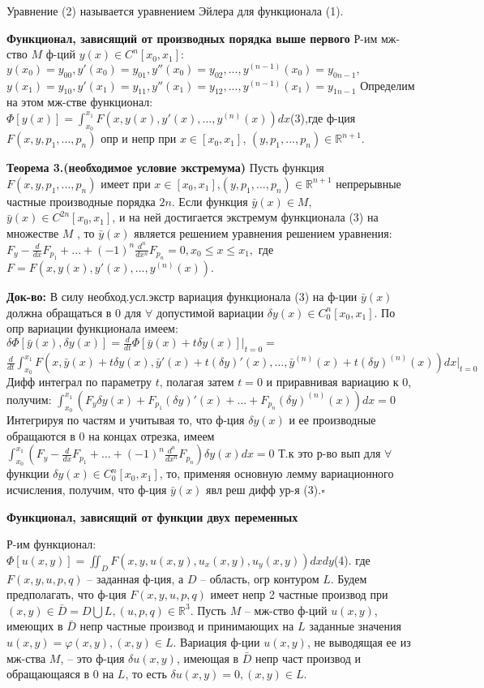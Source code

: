 Уравнение (2) называется уравнением Эйлера для функционала (1).

\textbf{Функционал, зависящий от производных порядка выше
первого}
Р-им мж-ство $M$ ф-ций $y(x) \in C^n[x_0, x_1]:$
$y(x_0) = y_{00} , y'(x_0) = y_{01}, y''(x_0) = y_{02},..., y^{(n-1)}(x_0) = y_{0n-1},$
$y(x_1) = y_{10} , y'(x_1) = y_{11}, y''(x_1) = y_{12},..., y^{(n-1)}(x_1) = y_{1n-1}$
Определим на этом мж-стве функционал:$\Phi[y(x)]=\int_{x_0}^{x_1}F(x,y(x),y'(x),...,y^{(n)}(x))dx$(3),где ф-ция $F(x,y,p_1,...,p_n)$ опр и непр при $x \in [x_0, x_1]$,
$(y,p_1,..., p_n) \in \mathbb{R}^{n+1}$.

\textbf{Теорема 3.(необходимое условие экстремума)}
    Пусть функция $F(x,y,p_1,...,p_n)$ имеет при $x\in[x_0, x_1]$,$(y,p_1,..., p_n) \in \mathbb{R}^{n+1}$ непрерывные частные производные порядка $2n$. Если функция $\bar y(x) \in M$, $\bar y(x) \in C^{2n}[x_0, x_1]$, и на ней достигается экстремум функционала (3) на множестве $M$ , то $\bar y(x)$ является решением уравнения
    решением уравнения:
    $F_y-\frac{d}{dx}F_{p_1}+...+(-1)^n\frac{d^n}{dx^n}F_{p_n}=0, x_0 \leq x \leq x_1,$
    где $F = F(x,y(x),y'(x),..., y^{(n)}(x))$.

\textbf{Док-во:}
    В силу необход.усл.экстр вариация
    функционала (3) на ф-ции $\bar y(x)$ должна обращаться в 0 для
    $\forall$ допустимой вариации $\delta y(x) \in C^n_0[x_0, x_1]$.
    По опр вариации функционала имеем:
    $\delta\Phi[\bar y(x), \delta y(x)]=\frac{d}{dt}\Phi[\bar y(x)+t\delta y(x)]\Big|_{t=0}=$
    $\frac{d}{dt}\int_{x_0}^{x_1}F(x,\bar y(x) + t\delta y(x), \bar y'(x)+t(\delta y)'(x),...,\bar y^{(n)}(x)+t(\delta y)^{(n)}(x))dx\Big|_{t=0}$
    Дифф интеграл по параметру $t$, полагая затем $t = 0$ и приравнивая вариацию к 0, получим:
    $\int_{x_0}^{x_1}(F_y\delta y(x) + F_{p_1}(\delta y)'(x)+...+F_{p_n}(\delta y)^{(n)}(x))dx=0$
    Интегрируя по частям и учитывая то, что ф-ция $\delta y(x)$ и ее производные обращаются в 0 на концах отрезка, имеем
    $\int_{x_0}^{x_1} (F_y-\frac{d}{dx}F_{p_1}+...+(-1)^n\frac{d^n}{dx^n}F_{p_n})\delta y(x) dx=0$
    Т.к это р-во вып для $\forall$ функции $\delta y(x) \in C^n_0[x_0, x_1]$,
    то, применяя основную лемму вариационного исчисления, получим, что
    ф-ция $\bar y(x)$ явл реш дифф ур-я (3).$\square$

\textbf{Функционал, зависящий от функции двух переменных}

Р-им функционал: $ \Phi[u(x, y)]=\iint_D F(x, y, u(x, y), u_x(x, y), u_y(x, y))dxdy$(4).
где $F(x, y, u, p, q)$ – заданная ф-ция, а $D$ – область, огр контуром $L$. Будем предполагать, что ф-ция $F(x, y, u, p, q)$ имеет непр 2 частные производ при $(x, y) \in \bar D = D \bigcup L, (u, p, q) \in \mathbb{R}^3$. Пусть $M$ – мж-ство ф-ций $u(x, y)$, имеющих в $\bar D$ непр частные производ и принимающих на $L$ заданные значения $u(x, y) = \varphi(x, y),(x, y) \in L$. Вариация ф-ции $u(x, y)$, не выводящая ее из мж-ства $M$, – это ф-ция $\delta u(x, y)$, имеющая в $\bar D$ непр част производ и обращающаяся в 0 на $L$, то есть $\delta u(x, y) = 0,(x, y) \in L$.

